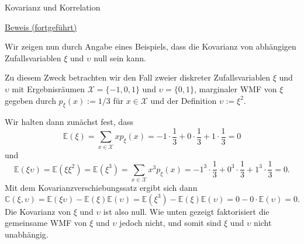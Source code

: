 \documentclass[
  8pt,
  ignorenonframetext,
]{beamer}
\newcommand{\ups}{\upsilon}
\begin{document}
\begin{frame}{Kovarianz und Korrelation}
\protect\hypertarget{kovarianz-und-korrelation-7}{}
\footnotesize

\underline{Beweis (fortgeführt)} \vspace{2mm}

Wir zeigen nun durch Angabe eines Beispiels, dass die Kovarianz von
abhängigen Zufallsvariablen \(\xi\) und \(\ups\) null sein kann.

Zu diesem Zweck betrachten wir den Fall zweier diskreter
Zufallsvariablen \(\xi\) und \(\ups\) mit Ergebnisräumen
\(\mathcal{X} = \{-1,0,1\}\) und \(\mathcal{\ups} = \{0,1\}\),
marginaler WMF von \(\xi\) gegeben durch \(p_\xi(x) := 1/3\) für
\(x \in \mathcal{X}\) und der Definition \(\ups := \xi^2\).

Wir halten dann zunächst fest, dass \begin{equation}
\mathbb{E}(\xi)
= \sum_{x \in \mathcal{X}} x p_\xi(x)
= -1 \cdot \frac{1}{3} + 0\cdot \frac{1}{3} + 1\cdot\frac{1}{3}
= 0
\end{equation} und \begin{equation}
\mathbb{E}(\xi\ups)
= \mathbb{E}(\xi\xi^2)
= \mathbb{E}(\xi^3)
= \sum_{x \in \mathcal{X}} x^3 p_\xi(x)
= -1^3 \cdot \frac{1}{3} + 0^3\cdot \frac{1}{3} + 1^3\cdot\frac{1}{3}
= 0.
\end{equation} Mit dem Kovarianzverschiebungssatz ergibt sich dann
\begin{equation}
\mathbb{C}(\xi,\ups)
= \mathbb{E}(\xi\ups) - \mathbb{E}(\xi)\mathbb{E}(\ups)
= \mathbb{E}(\xi^3) - \mathbb{E}(\xi)\mathbb{E}(\ups)
= 0 - 0\cdot \mathbb{E}(\ups)
= 0.
\end{equation} Die Kovarianz von \(\xi\) und \(\ups\) ist also null. Wie
unten gezeigt faktorisiert die gemeinsame WMF von \(\xi\) und \(\ups\)
jedoch nicht, und somit sind \(\xi\) und \(\ups\) nicht unabhängig.
\end{frame}
\end{document}
